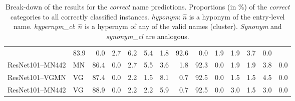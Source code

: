 \begin{table}[t]
\begin{tabular}{llr@{~}|r@{~}r@{~}r@{~}r@{~}r@{~}||r@{~}|r@{~}r@{~}r@{~}r@{~}r@{~}}
		 &                  83.9 &              0.0 &                 2.7 &               6.2 &              5.4 &                  1.8 &                  92.6 &              0.0 &                 1.9 &               1.9 &              3.7 &                  0.0 \\
		ResNet101--MN442 & MN %
		  &                  86.4 &              0.0 &                 2.7 &               5.5 &              3.6 &                  1.8 &                  92.3 &              0.0 &                 1.9 &               1.9 &              3.8 &                  0.0 \\
		ResNet101--VGMN & VG %
		 &                  87.4 &              0.0 &                 2.2 &               1.5 &              8.1 &                  0.7 &                  92.5 &              0.0 &                 1.5 &               1.5 &              4.5 &                  0.0 \\
		ResNet101--MN442 & VG%
		&                  88.9 &              0.0 &                 2.2 &               2.2 &              5.9 &                  0.7 &                  92.5 &              0.0 &                 3.0 &               1.5 &              3.0 &                  0.0 \\
		\bottomrule
	\end{tabular}
	
	\caption{Break-down of the results for the \textit{correct} name predictions. Proportions (in \%) of the \textit{correct} categories to all correctly classified instances.  \textit{hyponym}: $\hat{n}$ is a hyponym of the entry-level name. \textit{hypernym\_cl}: $\hat{n}$ is a hypernym of any of the valid names (cluster). \textit{Synonym} and \textit{synonym\_cl} are analogous. \label{tab:exp_details_correct}}
\end{table}

